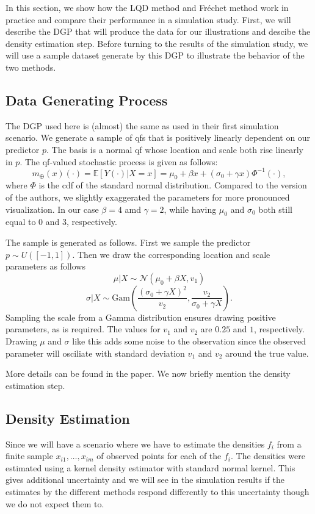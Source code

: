 In this section, we show how the LQD method and Fréchet method work in practice and
compare their performance in a simulation study. First, we will describe the DGP that
will produce the data for our illustrations and descibe the density estimation step.
Before turning to the results of the simulation study, we will use a sample dataset
generate by this DGP to illustrate the behavior of the two methods.

\subsection{Data Generating Process}
\label{sec:app_dgp}
The DGP used here is (almost) the same as \textcite{PetersenMüller2019} used in their first simulation
scenario. We generate a sample of qfs that is positively linearly dependent on our predictor
$p$. The basis is a normal qf whose location and scale both rise linearly in
$p$. The qf-valued stochastic process is given as follows:
\[
    m_{\oplus}(x)(\cdot) = \mathbb{E}[Y(\cdot)|X = x] = \mu_0 + \beta x + (\sigma_0 + \gamma x) \Phi^{-1}(\cdot),
\]
where $\Phi$ is the cdf of the standard normal distribution.
Compared to the version of the authors, we slightly exaggerated the parameters for more pronounced visualization. In our case
$\beta = 4$ amd $\gamma = 2$, while having $\mu_0$ and $\sigma_0$ both still equal to 0 and 3, respectively.

The sample is generated as follows. First we sample the predictor $p \sim U([-1,1])$.
Then we draw the corresponding location and scale parameters as follows
\[
    \mu|X \sim \mathcal{N}(\mu_0 + \beta X, v_1)
\]
\[
    \sigma|X \sim \text{Gam} \left( \frac{( \sigma_0 + \gamma X )^2}{v_2}, \frac{v_2}{\sigma_0 + \gamma X} \right).
\]
Sampling the scale from a Gamma distribution ensures drawing positive parameters, as is
required. The values for $v_1$ and $v_2$ are $0.25$ and $1$, respectively. Drawing $\mu$ and
$\sigma$ like this adds some noise to the observation since the observed parameter will osciliate
with standard deviation $v_1$ and $v_2$ around the true value.

More details can be found in the paper. We now briefly mention the density estimation
step.

\subsection{Density Estimation}
\label{sec:app_density_estimation}
Since we will have a scenario where we have to estimate the densities $f_i$ from a finite sample
$x_{i1},\dots, x_{im}$ of observed points for each of the $f_i$. The densities were
estimated using a kernel density estimator with standard normal kernel. This gives
additional uncertainty and we will see in the simulation results if the estimates
by the different methods respond differently to this uncertainty though we do not expect them
to.

